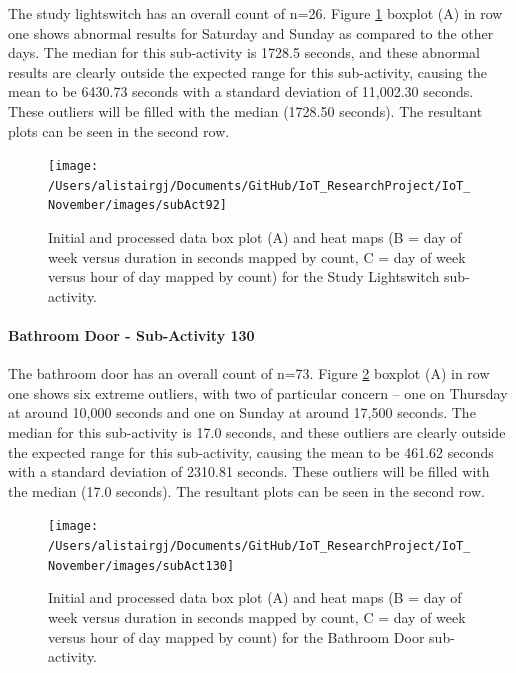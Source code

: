 \documentclass[11pt,]{article}
\let\oldparagraph\paragraph
\renewcommand{\paragraph}[1]{\oldparagraph{#1}\mbox{}}
\begin{document}
The study lightswitch has an overall count of n=26. Figure
\ref{fig:subAct92} boxplot (A) in row one shows abnormal results for
Saturday and Sunday as compared to the other days. The median for this
sub-activity is 1728.5 seconds, and these abnormal results are clearly
outside the expected range for this sub-activity, causing the mean to be
6430.73 seconds with a standard deviation of 11,002.30 seconds. These
outliers will be filled with the median (1728.50 seconds). The resultant
plots can be seen in the second row.

\begin{figure}[H]

{\centering \texttt{[image: /Users/alistairgj/Documents/GitHub/IoT\_ResearchProject/IoT\_November/images/subAct92]} 

}

\caption{Initial and processed data box plot (A) and heat maps (B = day of week versus duration in seconds mapped by count, C = day of week versus hour of day mapped by count) for the Study Lightswitch sub-activity.}\label{fig:subAct92}
\end{figure}

\hypertarget{bathroom-door---sub-activity-130}{%
\paragraph{Bathroom Door - Sub-Activity
130}\label{bathroom-door---sub-activity-130}}

The bathroom door has an overall count of n=73. Figure
\ref{fig:subAct130} boxplot (A) in row one shows six extreme outliers,
with two of particular concern -- one on Thursday at around 10,000
seconds and one on Sunday at around 17,500 seconds. The median for this
sub-activity is 17.0 seconds, and these outliers are clearly outside the
expected range for this sub-activity, causing the mean to be 461.62
seconds with a standard deviation of 2310.81 seconds. These outliers
will be filled with the median (17.0 seconds). The resultant plots can
be seen in the second row.

\begin{figure}[H]

{\centering \texttt{[image: /Users/alistairgj/Documents/GitHub/IoT\_ResearchProject/IoT\_November/images/subAct130]} 

}

\caption{Initial and processed data box plot (A) and heat maps (B = day of week versus duration in seconds mapped by count, C = day of week versus hour of day mapped by count) for the Bathroom Door sub-activity.}\label{fig:subAct130}
\end{figure}
\end{document}
